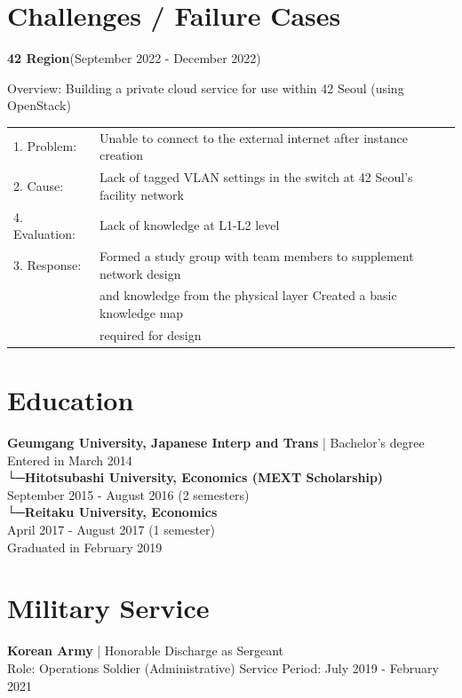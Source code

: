 \documentclass[11pt, a4paper]{article}
\begin{document}
\section{Challenges / Failure Cases}
\textbf{42 Region}(September 2022 - December 2022)

Overview: Building a private cloud service for use within 42 Seoul (using OpenStack)\\

\begin{tabular}{l l}
    1. Problem:&Unable to connect to the external internet after instance creation\\
    2. Cause:&Lack of tagged VLAN settings in the switch at 42 Seoul's facility network\\
    4. Evaluation:&Lack of knowledge at L1-L2 level\\
    3. Response:&Formed a study group with team members to supplement network design \\
                &and knowledge from the physical layer Created a basic knowledge map \\
                &required for design\\
\end{tabular}


\section{Education}
\textbf{Geumgang University, Japanese Interp and Trans} | Bachelor's degree\\
Entered in March 2014\\
\hspace*{0.5cm}└─\textbf{Hitotsubashi University, Economics (MEXT Scholarship)}\\
\hspace*{1cm}September 2015 - August 2016 (2 semesters)\\
\hspace*{0.5cm}└─\textbf{Reitaku University, Economics}\\
\hspace*{1cm}April 2017 - August 2017 (1 semester)\\
Graduated in February 2019\\

\section{Military Service}
\textbf{Korean Army} | Honorable Discharge as Sergeant\\
Role: Operations Soldier (Administrative)
Service Period: July 2019 - February 2021
\end{document}
